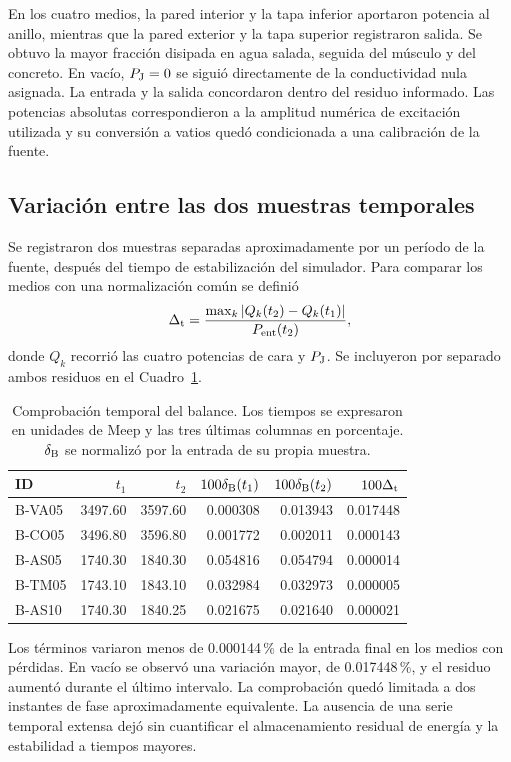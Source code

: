 En los cuatro medios, la pared interior y la tapa inferior aportaron potencia al anillo, mientras que la pared exterior y la tapa superior registraron salida. Se obtuvo la mayor fracción disipada en agua salada, seguida del músculo y del concreto. En vacío, $P_{\rm J}=0$ se siguió directamente de la conductividad nula asignada. La entrada y la salida concordaron dentro del residuo informado. Las potencias absolutas correspondieron a la amplitud numérica de excitación utilizada y su conversión a vatios quedó condicionada a una calibración de la fuente.

\subsection{Variación entre las dos muestras temporales}
Se registraron dos muestras separadas aproximadamente por un período de la fuente, después del tiempo de estabilización del simulador. Para comparar los medios con una normalización común se definió
\begin{equation}
 \Delta_{\rm t}=\frac{\max_k|Q_k(t_2)-Q_k(t_1)|}{P_{\rm ent}(t_2)},
 \label{eq:variacion-temporal}
\end{equation}
donde $Q_k$ recorrió las cuatro potencias de cara y $P_{\rm J}$. Se incluyeron por separado ambos residuos en el Cuadro~\ref{tab:balance-tiempo}.

\begin{table}[htbp]\centering\small
\caption{Comprobación temporal del balance. Los tiempos se expresaron en unidades de Meep y las tres últimas columnas en porcentaje. $\delta_{\rm B}$ se normalizó por la entrada de su propia muestra.}\label{tab:balance-tiempo}
\begin{tabular}{lrrrrr}\hline
ID & $t_1$ & $t_2$ & $100\delta_{\rm B}(t_1)$ & $100\delta_{\rm B}(t_2)$ & $100\Delta_{\rm t}$ \\ \hline
B-VA05 & 3497.60 & 3597.60 & 0.000308 & 0.013943 & 0.017448 \\
B-CO05 & 3496.80 & 3596.80 & 0.001772 & 0.002011 & 0.000143 \\
B-AS05 & 1740.30 & 1840.30 & 0.054816 & 0.054794 & 0.000014 \\
B-TM05 & 1743.10 & 1843.10 & 0.032984 & 0.032973 & 0.000005 \\
B-AS10 & 1740.30 & 1840.25 & 0.021675 & 0.021640 & 0.000021 \\ \hline
\end{tabular}\end{table}

Los términos variaron menos de 0.000144\,\% de la entrada final en los medios con pérdidas. En vacío se observó una variación mayor, de 0.017448\,\%, y el residuo aumentó durante el último intervalo. La comprobación quedó limitada a dos instantes de fase aproximadamente equivalente. La ausencia de una serie temporal extensa dejó sin cuantificar el almacenamiento residual de energía y la estabilidad a tiempos mayores.

